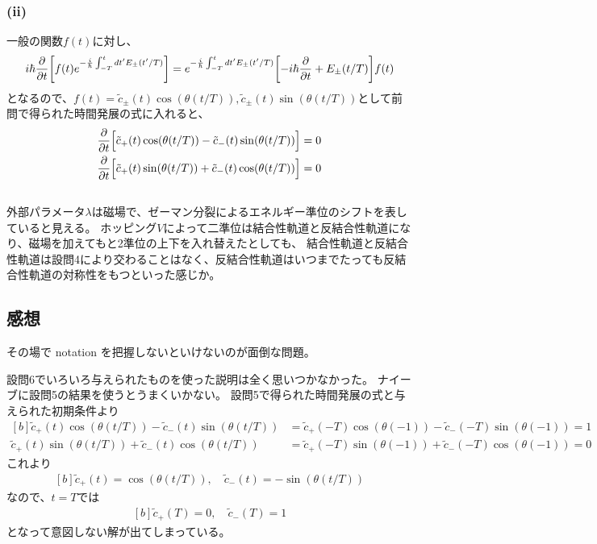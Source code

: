 \documentclass[../../sp_2017.tex]{subfiles}
\begin{document}
\subsubsection{(ii)}
一般の関数\(f(t)\)に対し、
\begin{equation}\begin{aligned}[b]
    i\hbar\pdv{t}\qty[f(t)e^{-\frac{i}{\hbar}\int_{-T}^t dt'E_\pm(t'/T)}]
    =e^{-\frac{i}{\hbar}\int_{-T}^t dt'E_\pm(t'/T)} \qty[-i\hbar\pdv{t}+E_\pm(t/T)]f(t)
\end{aligned}\end{equation}
となるので、\(f(t)=\tilde{c}_\pm(t)\cos(\theta(t/T)),\tilde{c}_\pm(t)\sin(\theta(t/T))\)として前問で得られた時間発展の式に入れると、
\begin{equation}\begin{aligned}[b]
    \pdv{t}\Bigl[\tilde{c}_+(t)\cos(\theta(t/T))-\tilde{c}_-(t)\sin(\theta(t/T))\Bigr]&=0\\
    \pdv{t}\Bigl[\tilde{c}_+(t)\sin(\theta(t/T))+\tilde{c}_-(t)\cos(\theta(t/T))\Bigr]&=0
\end{aligned}\end{equation}

\subsection{}
外部パラメータ\(\lambda\)は磁場で、ゼーマン分裂によるエネルギー準位のシフトを表していると見える。
ホッピング\(V\)によって二準位は結合性軌道と反結合性軌道になり、磁場を加えてもと2準位の上下を入れ替えたとしても、
結合性軌道と反結合性軌道は設問4により交わることはなく、反結合性軌道はいつまでたっても反結合性軌道の対称性をもつといった感じか。


\subsection*{感想}
その場で notation を把握しないといけないのが面倒な問題。

設問6でいろいろ与えられたものを使った説明は全く思いつかなかった。
ナイーブに設問5の結果を使うとうまくいかない。
設問5で得られた時間発展の式と与えられた初期条件より
\begin{equation*}\begin{aligned}[b]
    \tilde{c}_+(t)\cos(\theta(t/T))-\tilde{c}_-(t)\sin(\theta(t/T))&=\tilde{c}_+(-T)\cos(\theta(-1))-\tilde{c}_-(-T)\sin(\theta(-1))=1\\
    \tilde{c}_+(t)\sin(\theta(t/T))+\tilde{c}_-(t)\cos(\theta(t/T))&=\tilde{c}_+(-T)\sin(\theta(-1))+\tilde{c}_-(-T)\cos(\theta(-1))=0
\end{aligned}\end{equation*}
これより
\begin{equation*}\begin{aligned}[b]
    \tilde{c}_+(t)=\cos(\theta(t/T)),\quad
     \tilde{c}_-(t)=-\sin(\theta(t/T))
\end{aligned}\end{equation*}
なので、\(t=T\)では
\begin{equation*}\begin{aligned}[b]
    \tilde{c}_+(T)=0,\quad
     \tilde{c}_-(T)=1
\end{aligned}\end{equation*}
となって意図しない解が出てしまっている。
\end{document}
